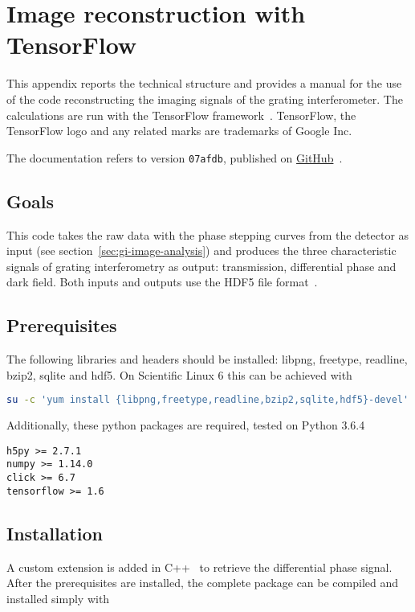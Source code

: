 \chapter{Image reconstruction with TensorFlow\texttrademark}
This appendix reports the technical structure and provides a manual for the
use of the code reconstructing the imaging signals of the grating
interferometer. The calculations are run with the TensorFlow
framework~\cite{tensorflow2015-whitepaper}.
TensorFlow, the TensorFlow logo and any related marks are trademarks of
Google Inc.

The documentation refers to version \texttt{07afdb}, published on 
\href{https://github.com/Enucatl/dpc_reconstruction/tree/420ed0e17fa827c710df1d25b96dc02a45ff0488}{GitHub}~\cite{dpc_reconstruction}.

\section{Goals}
This code takes the raw data with the phase stepping curves from the
detector as input (see section~\ref{sec:gi-image-analysis}) and produces the
three characteristic signals of grating interferometry as output:
transmission, differential phase and dark field.
Both inputs and outputs use the HDF5 file format~\cite{hdf5}.

\section{Prerequisites}
The following libraries and headers should be installed:
libpng, freetype, readline, bzip2, sqlite and hdf5. On Scientific Linux 6 this can be achieved with
\begin{lstlisting}[language=bash]
    su -c 'yum install {libpng,freetype,readline,bzip2,sqlite,hdf5}-devel'
\end{lstlisting}
Additionally, these python packages are required, tested on Python
3.6.4~\cite{python}
\begin{lstlisting}
h5py >= 2.7.1
numpy >= 1.14.0
click >= 6.7
tensorflow >= 1.6
\end{lstlisting}

\section{Installation}
A custom extension is added in C++~\cite{Stroustrup:2013:CPL:2543987} to
retrieve the differential phase signal. After the prerequisites are
installed, the complete package can be compiled and installed simply with

